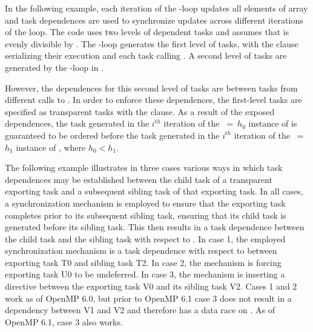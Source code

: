 In the following example,
each iteration of the -loop updates all
elements of array  and task dependences are used to synchronize
updates across different iterations of the loop. The code uses two levels of
dependent tasks and assumes that
 is evenly divisible by .
The -loop generates the first level of tasks, with
the  clause serializing their execution and each task calling
. A second level of tasks are generated by the -loop in
.

However, the dependences for this second level of tasks are between tasks from
different calls to . In order to enforce these dependences, the
first-level tasks are specified as transparent tasks with the
 clause.  As a result of the exposed
dependences, the task generated in the $i^{th}$ iteration of the
~=~$h_0$ instance of  is guaranteed to be ordered before
the task generated in the $i^{th}$ iteration of the ~=~$h_1$ instance of
, where $h_0 < h_1$.


The following example illustrates in three cases various ways in which task
dependences may be established between the child task of a transparent exporting
task and a subsequent sibling task of that exporting task. In all cases, a
synchronization mechanism is employed to ensure that the exporting task
completes prior to its subsequent sibling task, ensuring that its child task is
generated before its sibling task. This then results in a task dependence
between the child task and the sibling task with respect to . In case
1, the employed synchronization mechanism is a task dependence with respect to
 between exporting task T0 and sibling task T2. In case 2, the
mechanism is forcing exporting task U0 to be undeferred. In case 3, the
mechanism is inserting a  directive between the exporting task
V0 and its sibling task V2. Cases 1 and 2 work as of OpenMP 6.0, but prior to
OpenMP 6.1 case 3 does not result in a dependency between V1 and V2 and
therefore has a data race on . As of OpenMP 6.1, case 3 also works.


